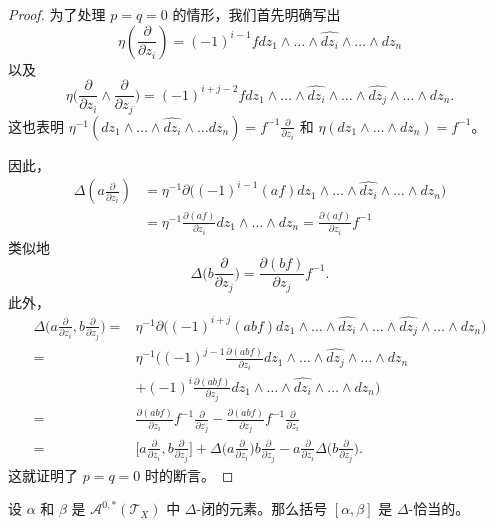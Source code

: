 \begin{proof}
    为了处理 $p=q=0$ 的情形，我们首先明确写出\[
        \eta(\frac{\partial}{\partial z_i})=(-1)^{i-1} fdz_1\wedge\dots\wedge\widehat{dz_i}\wedge\dots\wedge dz_n
    \]以及\[
        \eta\bigg(\frac{\partial}{\partial z_i}\wedge\frac{\partial}{\partial z_j}\bigg)=(-1)^{i+j-2} fdz_1 \wedge \dots\wedge\widehat{dz_i}\wedge\dots\wedge\widehat{dz_j}\wedge\dots\wedge dz_n.
    \]这也表明 $\eta^{-1}(dz_1\wedge\dots\wedge\widehat{dz_i}\wedge\dots dz_n)=f^{-1}\frac{\partial}{\partial z_i}$ 和 $\eta(dz_1\wedge\dots\wedge dz_n)=f^{-1}$。

    因此，\begin{align*}
        \varDelta(a\frac{\partial}{\partial z_i})&=\eta^{-1}\partial\Big((-1)^{i-1}(af)dz_1\wedge\dots\wedge\widehat{dz_i}\wedge\dots\wedge dz_n\Big)\\
        &=\eta^{-1}\frac{\partial(af)}{\partial z_i}dz_1 \wedge \dots\wedge dz_n=\frac{\partial(af)}{\partial z_i}f^{-1}
    \end{align*}类似地\[
        \varDelta\bigg(b\frac{\partial}{\partial z_j}\bigg)=\frac{\partial(bf)}{\partial z_j}f^{-1}.
    \]此外，\begin{align*}
        \varDelta\bigg(a\frac{\partial}{\partial z_i},b\frac{\partial}{\partial z_j}\bigg)=&\eta^{-1}\partial\Big((-1)^{i+j}(abf)dz_1 \wedge\dots\wedge\widehat{dz_i}\wedge\dots\wedge\widehat{dz_j}\wedge\dots\wedge dz_n\Big)\\
        =&\eta^{-1}\bigg((-1)^{j-1}\frac{\partial(abf)}{\partial z_i}dz_1 \wedge\dots\wedge\widehat{dz_j}\wedge\dots\wedge dz_n\\
        &+(-1)^i \frac{\partial(abf)}{\partial z_j}dz_1\wedge\dots\wedge\widehat{dz_i}\wedge\dots\wedge dz_n\bigg)\\
        =&\frac{\partial(abf)}{\partial z_i}f^{-1}\frac{\partial}{\partial z_j}-\frac{\partial(abf)}{\partial z_j}f^{-1}\frac{\partial}{\partial z_i}\\
        =&\bigg[a\frac{\partial}{\partial z_i},b\frac{\partial}{\partial z_j}\bigg]+\varDelta\bigg(a \frac{\partial}{\partial z_i}\bigg)b\frac{\partial}{\partial z_j}-a\frac{\partial}{\partial z_i}\varDelta\bigg(b\frac{\partial}{\partial z_j}\bigg).
    \end{align*}这就证明了 $p=q=0$ 时的断言。
\end{proof}

\begin{corollary}
    设 $\alpha$ 和 $\beta$ 是 $\mathcal{A}^{0,*}(\mathcal{T}_X)$ 中 $\varDelta$-闭的元素。那么括号 $[\alpha,\beta]$ 是 $\varDelta$-恰当的。
\end{corollary}

